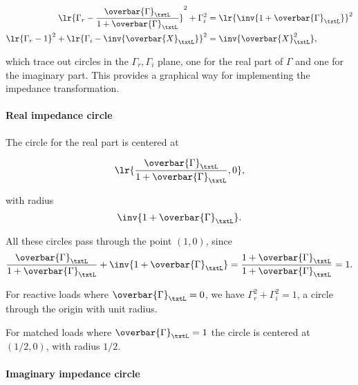 \begin{equation}\label{eqn:uwavesDeck5SmithChartCore:440}
\begin{aligned}
\lr{ \Gamma_r - \frac{\overbar{\Gamma}_\txtL}{1 + \overbar{\Gamma}_\txtL } }^2 + \Gamma_i^2 &= \lr{ \inv{1 + \overbar{\Gamma}_\txtL }}^2 \\
\lr{ \Gamma_r - 1 }^2 + \lr{ \Gamma_i - \inv{\overbar{X}_\txtL } }^2 &= \inv{\overbar{X}_\txtL^2},
\end{aligned}
\end{equation}

which trace out circles in the \( \Gamma_r, \Gamma_i \) plane, one for the real part of \( \Gamma \) and one for the imaginary part.  This provides a graphical way for implementing the impedance transformation.

\paragraph{Real impedance circle}

The circle for the real part is centered at

\begin{dmath}\label{eqn:uwavesDeck5SmithChartCore:580}
\lr{ \frac{\overbar{\Gamma}_\txtL}{1 + \overbar{\Gamma}_\txtL }, 0 },
\end{dmath}

with radius
\begin{dmath}\label{eqn:uwavesDeck5SmithChartCore:600}
\inv{1 + \overbar{\Gamma}_\txtL }.
\end{dmath}

All these circles pass through the point \( (1,0) \), since
\begin{dmath}\label{eqn:uwavesDeck5SmithChartCore:620}
\frac{\overbar{\Gamma}_\txtL}{1 + \overbar{\Gamma}_\txtL } + \inv{1 + \overbar{\Gamma}_\txtL }
=
\frac{1 + \overbar{\Gamma}_\txtL}{1 + \overbar{\Gamma}_\txtL }
= 1.
\end{dmath}

For reactive loads where \( \overbar{\Gamma}_\txtL = 0 \), we have \( \Gamma_r^2 + \Gamma_i^2 = 1 \), a circle through the origin with unit radius.

For matched loads where \( \overbar{\Gamma}_\txtL = 1 \) the circle is centered at \( (1/2, 0) \), with radius \( 1/2 \).

\paragraph{Imaginary impedance circle}

